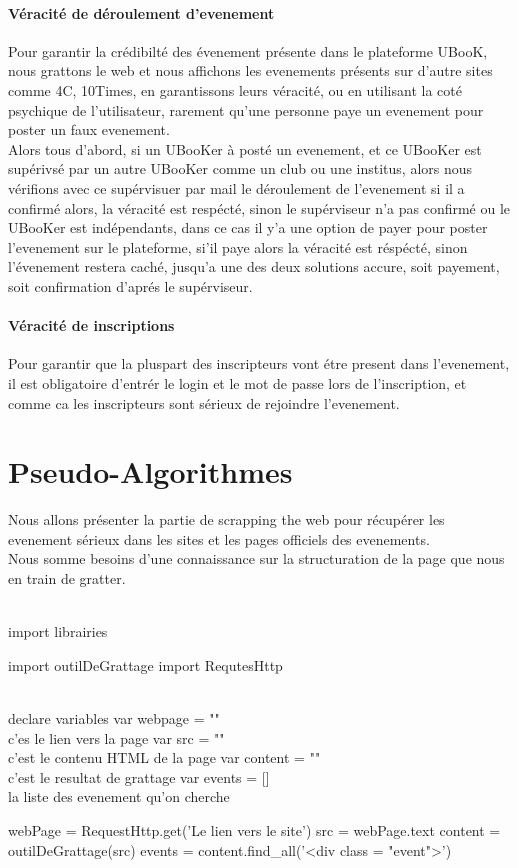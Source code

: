\documentclass[12pt]{report}
\begin{document}
\paragraph{Véracité de déroulement d'evenement} Pour garantir la crédibilté des évenement présente dans le plateforme UBooK, nous grattons le web et nous affichons les evenements présents sur d'autre sites comme 4C, 10Times, en garantissons leurs véracité, ou en utilisant la coté psychique de l'utilisateur, rarement qu'une personne paye un evenement pour poster un faux evenement. \\
Alors tous d'abord, si un UBooKer à posté un evenement, et ce UBooKer est supérivsé par un autre UBooKer comme un club ou une institus, alors nous vérifions avec ce supérvisuer par mail le déroulement de l'evenement si il a confirmé alors, la véracité est respécté, sinon le supérviseur n'a pas confirmé ou le UBooKer est indépendants, dans ce cas il y'a une option de payer pour poster l'evenement sur le plateforme, si'il paye alors la véracité est réspécté, sinon l'évenement restera caché, jusqu'a une des deux solutions accure, soit payement, soit confirmation d'aprés le supérviseur.
\paragraph{Véracité de inscriptions} Pour garantir que la pluspart des inscripteurs vont étre present dans l'evenement, il est obligatoire d'entrér le login et le mot de passe lors de l'inscription, et comme ca les inscripteurs sont sérieux de rejoindre l'evenement. 
\section{Pseudo-Algorithmes}

Nous allons présenter la partie de scrapping the web pour récupérer les evenement sérieux dans les sites et les pages officiels des evenements.\\
Nous somme besoins d'une connaissance sur la structuration de la page que nous en train de gratter.

\begin{customFrame}
\\ import librairies

import outilDeGrattage
import RequtesHttp

\\ declare variables 
var webpage = "" \\ c'es le lien vers la page
var src = "" \\ c'est le contenu HTML de la page
var content = ""\\ c'est le resultat de grattage
var events = [] \\ la liste des  evenement qu'on cherche

webPage = RequestHttp.get('Le lien vers le site')
src = webPage.text
content = outilDeGrattage(src)
events = content.find_all('<div class = "event">')
\end{customFrame}
\end{document}
